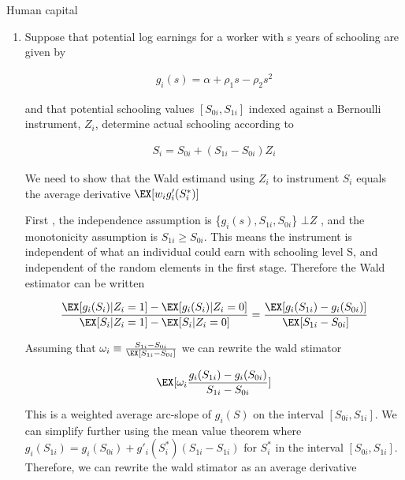 Human capital

\begin{enumerate}[label=(\alph*)]

\item 
Suppose that potential log earnings for a worker with s years of schooling are given by

\begin{equation}
\begin{aligned}
g_i(s) = \alpha + \rho_1s-\rho_2s^2
\end{aligned}
\end{equation}

and that potential schooling values $[S_{0i}, S_{1i}]$  indexed against a Bernoulli instrument, $Z_i$, determine
actual schooling according to

\begin{equation}
\begin{aligned}
S_i = S_{0i} + (S_{1i}-S_{0i})Z_i
\end{aligned}
\end{equation}

We need to show that the Wald estimand using $Z_i$ to instrument $S_i$ equals the average derivative $\EX[w_ig'_i(S_i^*)]$

First , the independence assumption is \{$g_i(s), S_{1i}, S_{0i}$\} $\bot Z$ , and the monotonicity assumption is $S_{1i} \geq S_{0i}$. This means the instrument is independent of what an individual could earn with schooling level S, and independent of the random elements in the first stage. Therefore the Wald estimator can be written 

\begin{equation}
\begin{aligned}
\frac{\EX[g_i(S_i)|Z_i = 1] - \EX[g_i(S_i)|Z_i = 0]}
{\EX[S_i|Z_i = 1] - \EX[S_i|Z_i = 0]} = 
\frac{\EX[g_i(S_{1i})-g_i(S_{0i})]}
{\EX[S_{1i} - S_{0i}]}
\end{aligned}
\end{equation}

Assuming that $\omega_i \equiv \frac{S_{1i} - S_{0i}}{\EX[S_{1i} - S_{0i}]}$
we can rewrite the wald stimator 

\begin{equation}
\begin{aligned}
\EX[\omega_i\frac{g_i(S_{1i})-g_i(S_{0i})}{S_{1i} - S_{0i}} ]
\end{aligned}
\end{equation}

This is a weighted average arc-slope of $g_i(S)$ on the interval $[S_{0i}, S_{1i}]$. We can simplify further using the mean value theorem where $g_i(S_{1i}) = g_i(S_{0i}) + g'_i(S_i^{*})(S_{1i} - S_{1i})$ for $S_i^{*}$ in the interval $[S_{0i}, S_{1i}]$. Therefore, we can rewrite the wald stimator as an average derivative 


\end{enumerate}
